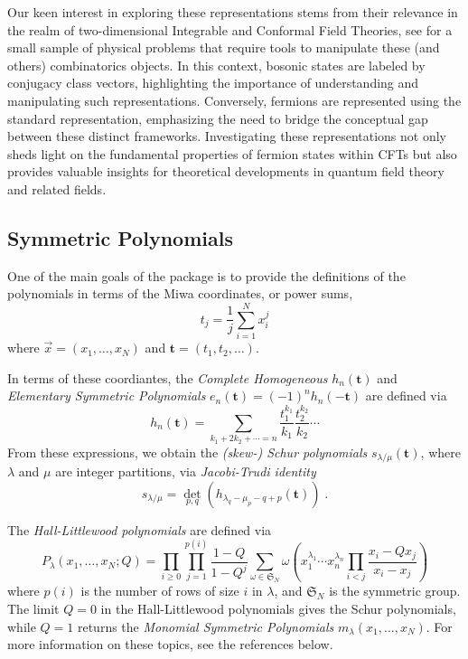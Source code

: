 \documentclass[a4paper,10pt]{amsart}
\begin{document}
Our keen interest in exploring these representations stems from their
relevance in the realm of two-dimensional Integrable and Conformal
Field Theories, see \cite{Babelon:2003, Marino:2005, Okounkov:2006} for
a small sample of physical problems that require tools to manipulate
these (and others) combinatorics objects. In this context, bosonic
states are labeled by conjugacy class vectors, highlighting the
importance of understanding and manipulating such
representations. Conversely, fermions are represented using the
standard representation, emphasizing the need to bridge the conceptual
gap between these distinct frameworks. Investigating these
representations not only sheds light on the fundamental properties of
fermion states within CFTs but also provides valuable insights for
theoretical developments in quantum field theory and related fields.

\subsection{Symmetric Polynomials}

One of the main goals of the package is to provide the definitions of the 
polynomials in terms of the Miwa coordinates, or power sums, 
$$ t_j = \frac{1}{j} \sum_{i=1}^N x_i^j $$ where $\vec{x} = 
(x_1, \dots, x_N)$ and $\mathbf{t} = (t_1, t_2, \dots)$.

In terms of these coordiantes, the \emph{Complete Homogeneous} $h_n(\mathbf{t})$ 
and \emph{Elementary Symmetric Polynomials} $e_n(\mathbf{t}) = 
(-1)^n h_n(-\mathbf{t})$ are defined via 
$$ h_n(\mathbf{t}) = \sum_{k_1 + 2k_2+ \cdots = n} 
\frac{t_1^{k_1}}{k_1}\frac{t_2^{k_2}}{k_2} \cdots $$
From these expressions, we obtain the \emph{(skew-) Schur polynomials}
$s_{\lambda/\mu}(\mathbf{t})$, where 
$\lambda$ and $\mu$ are integer partitions, via \emph{Jacobi-Trudi identity}
$$ s_{\lambda/\mu} = \det_{p,q}(h_{\lambda_q - \mu_p - q + p}(\mathbf{t})) \; . $$

The \emph{Hall-Littlewood polynomials} are defined via
$$
P_{\lambda}(x_1, \dots, x_N; Q) = \prod_{i\geq 0} \prod_{j=1}^{p(i)}
\frac{1-Q}{1-Q^j} \sum_{\omega \in \mathfrak{S}_N} \omega\left(
x_1^{\lambda_1}\cdots x_n^{\lambda_n} \prod_{i<j} \frac{x_i - Q
  x_j}{x_i - x_j} \right)
$$
where $p(i)$ is the number of rows of size $i$ in $\lambda$, and
$\mathfrak{S}_N$ is the symmetric group. The limit $Q=0$ in the
Hall-Littlewood polynomials gives the Schur polynomials, while $Q=1$
returns the \emph{Monomial Symmetric Polynomials} $m_\lambda(x_1,
\dots, x_N)$. For more information on these topics, see the references
below.
\end{document}
